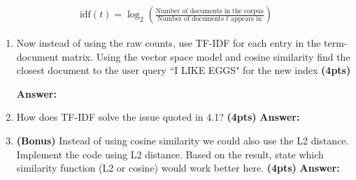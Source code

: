 \documentclass{assignment format}
\newenvironment{answer}{
    {\bf Answer:} \begingroup\color{red}
}{\endgroup}%
\begin{document}
     \begin{align*}
         \text{idf}(t) = \log_2(\frac{\text{Number of documents in the corpus}}{\text{Number of documents $t$ appears in}})
     \end{align*}\begin{enumerate}[label=(\alph*)]
         \item  Now instead of using the raw counts, use TF-IDF for each entry in the term-document matrix. Using the vector space model and cosine similarity find the closest document to the user query ``I LIKE EGGS" for the new index  \textbf{(4pts)}

\begin{answer}

    \end{answer}
	\item How does TF-IDF solve the issue quoted in 4.1? \textbf{(4pts)}
    \begin{answer}

    \end{answer}
    \item \textbf{(Bonus)} Instead of using cosine similarity we could also use the L2 distance. Implement the code using L2 distance. Based on the result, state which similarity function (L2 or cosine) would work better here.   \textbf{(4pts)}
            \begin{answer}

    \end{answer}

\end{enumerate}
\end{document}
